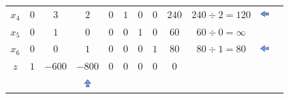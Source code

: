 \begin{frame}
{\begin{table}
\begin{tabular}{c c c c c c c c c c c c}
				\cellcolor{blue!80} \color{red} $ \scriptstyle x_4$
				& \cellcolor{yellow!60}  $ \scriptstyle 0$
				& \cellcolor{yellow!60}  $ \scriptstyle 3$ 
				& \cellcolor{gray!60}  $ \scriptstyle 2$
				& \cellcolor{yellow!60}  $ \scriptstyle 0$
				& \cellcolor{yellow!60}  $ \scriptstyle 1$
				& \cellcolor{yellow!60}  $ \scriptstyle 0$
				& \cellcolor{yellow!60}  $ \scriptstyle 0$ 
				& \cellcolor{gray!60}  $ \scriptstyle 240$ 
				& $ \scriptstyle 240 \div 2 = 120$
				& \includegraphics[width=0.3cm,height=0.3cm]{setaesquerda.jpg} \\ 
				\cellcolor{blue!80} \color{red} $ \scriptstyle x_5$  
				& \cellcolor{yellow!60}  $ \scriptstyle 0$
				& \cellcolor{yellow!60}  $ \scriptstyle 1$ 
				& \cellcolor{gray!60}  $ \scriptstyle 0$
				& \cellcolor{yellow!60}  $ \scriptstyle 0$
				& \cellcolor{yellow!60}  $ \scriptstyle 0$
				& \cellcolor{yellow!60}  $ \scriptstyle 1$
				& \cellcolor{yellow!60}  $ \scriptstyle 0$ 
				& \cellcolor{gray!60}  $ \scriptstyle 60$ 
				& $ \scriptstyle 60 \div 0 = \infty$ \\
				\cellcolor{blue!80} \color{red} $ \scriptstyle x_6$
				& \cellcolor{yellow!60}  $ \scriptstyle 0$
				& \cellcolor{yellow!60}  $ \scriptstyle 0$ 
				& \cellcolor{gray!60}  $ \scriptstyle 1$
				& \cellcolor{yellow!60}  $ \scriptstyle 0$
				& \cellcolor{yellow!60}  $ \scriptstyle 0$
				& \cellcolor{yellow!60}  $ \scriptstyle 0$
				& \cellcolor{yellow!60}  $ \scriptstyle 1$ 
				& \cellcolor{gray!60}  $ \scriptstyle 80$ 
				& $ \scriptstyle 80 \div 1 = 80$
				& \includegraphics[width=0.3cm,height=0.3cm]{setaesquerda.jpg} \\
				\cellcolor{blue!80} \color{white} $ \scriptstyle z$
				& \cellcolor{yellow!60}  $ \scriptstyle 1$
				& \cellcolor{yellow!60}  $ \scriptstyle -600$ 
				& \cellcolor{gray!60}  $ \scriptstyle -800$
				& \cellcolor{yellow!60}  $ \scriptstyle 0$
				& \cellcolor{yellow!60}  $ \scriptstyle 0$
				& \cellcolor{yellow!60}  $ \scriptstyle 0$
				& \cellcolor{yellow!60}  $ \scriptstyle 0$ 
				& \cellcolor{gray!60}  $ \scriptstyle 0$ \\
				& & & \includegraphics[width=0.3cm,height=0.3cm]{setacima.jpg} \\

\end{tabular}
\end{table}}
\end{frame}
